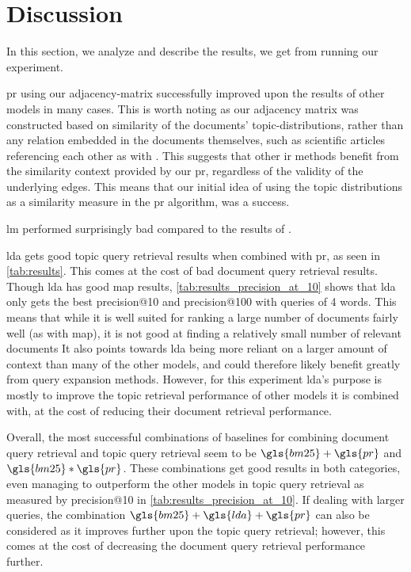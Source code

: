\section{Discussion}\label{sec:discussion}
In this section, we analyze and describe the results, we get from running our experiment.

\gls{pr} using our adjacency-matrix successfully improved upon the results of other models in many cases.
This is worth noting as our adjacency matrix was constructed based on similarity of the documents' topic-distributions, rather than any relation embedded in the documents themselves, such as scientific articles referencing each other as with \citeauthor{yang2009topic}\cite{yang2009topic}.
This suggests that other \gls{ir} methods benefit from the similarity context provided by our \gls{pr}, regardless of the validity of the underlying edges.
This means that our initial idea of using the topic distributions as a similarity measure in the \gls{pr} algorithm, was a success.

\gls{lm} performed surprisingly bad compared to the results of \cite{yang2009topic}. 

\gls{lda} gets good topic query retrieval results when combined with \gls{pr}, as seen in \autoref{tab:results}.
This comes at the cost of bad document query retrieval results.
Though \gls{lda} has good \gls{map} results, \autoref{tab:results_precision_at_10} shows that \gls{lda} only gets the best precision@10 and precision@100 with queries of 4 words.
This means that while it is well suited for ranking a large number of documents fairly well (as with \gls{map}), it is not good at finding a relatively small number of relevant documents
It also points towards \gls{lda} being more reliant on a larger amount of context than many of the other models, and could therefore likely benefit greatly from query expansion methods.
However, for this experiment \gls{lda}'s purpose is mostly to improve the topic retrieval performance of other models it is combined with, at the cost of reducing their document retrieval performance.

Overall, the most successful combinations of baselines for combining document query retrieval and topic query retrieval seem to be $\gls{bm25}+\gls{pr}$ and $\gls{bm25}*\gls{pr}$.
These combinations get good results in both categories, even managing to outperform the other models in topic query retrieval as measured by precision@10 in \autoref{tab:results_precision_at_10}.
If dealing with larger queries, the combination $\gls{bm25}+\gls{lda}+\gls{pr}$ can also be considered as it improves further upon the topic query retrieval; however, this comes at the cost of decreasing the document query retrieval performance further.
